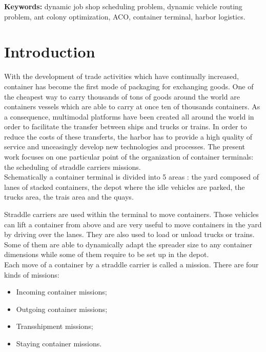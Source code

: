 \documentclass[a4paper,12pt]{article}
\begin{document}
{\bf Keywords: } dynamic job shop scheduling problem, dynamic vehicle routing problem, ant colony optimization, ACO, container terminal, harbor logistics.\\

\section{Introduction}

With the development of trade activities which have continually increased, container has become the first mode of packaging for exchanging goods. One of the cheapest way to carry thousands of tons of goods around the world are containers vessels which are able to carry at once ten of thousands containers. As a consequence, multimodal platforms have been created all around the world in order to facilitate the transfer between ships and trucks or trains. In order to reduce the costs of these transferts, the harbor has to provide a high quality of service and unceasingly develop new technologies and processes. The present work focuses on one particular point of the organization of container terminals: the scheduling of straddle carriers missions.\\

Schematically a container terminal is divided into 5 areas : the yard composed of lanes of stacked containers, the depot where the idle vehicles are parked, the trucks area, the trais area and the quays.

Straddle carriers are used within the terminal to move containers. Those vehicles can lift a container from above and are very useful to move containers in the yard by driving over the lanes. They are also used to load or unload trucks or trains. Some of them are able to dynamically adapt the spreader size to any container dimensions while some of them require to be set up in the depot.\\%


Each move of a container by a straddle carrier is called a mission. There are four kinds of missions:
\begin{itemize}
	\item Incoming container missions;
	\item Outgoing container missions;
	\item Transshipment missions;
	\item Staying container missions.
\end{itemize}
\end{document}

